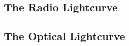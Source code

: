 \subsection{\label{sec:radio}The Radio Lightcurve}

\subsection{\label{sec:optical}The Optical Lightcurve}
